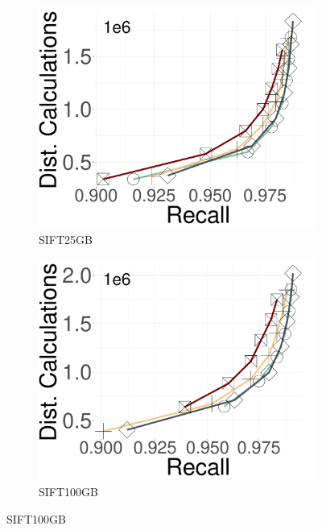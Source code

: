 \begin{figure}[h!]
		\begin{subfigure}{0.28\columnwidth}
			\centering
			\captionsetup{justification=centering}	
			\includegraphics[width=\textwidth]{../img/Experiments/RNG/DC_SIFT25GB.pdf}
   \caption{{SIFT25GB}}
		\label{fig:ND:sift25GB}
		\end{subfigure}	
  \hspace{0.5cm}
		\begin{subfigure}{0.28\columnwidth}
			\centering
			\captionsetup{justification=centering}	
			\includegraphics[width=\textwidth]{../img/Experiments/RNG/DC_SIFT100GB.pdf}
             \caption{{SIFT100GB}}

\end{subfigure}
\end{figure}
